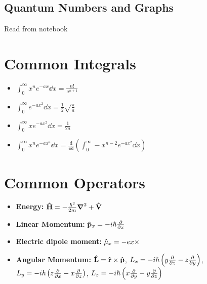 \documentclass[11pt]{article}
\theoremstyle{definition}
\begin{document}
\subsection{Quantum Numbers and Graphs}
Read from notebook

\section{Common Integrals}
\begin{itemize}
    \item $\int_0 ^{\infty} x^n e^{-a x} \dd{x}=\frac{n!}{a^{n+1}} $
    \item $\int_0^{\infty} e^{-ax^2} \dd{x} = \frac{1}{2} \sqrt{\frac{\pi}{a}} $
    \item $\int_0^{\infty} xe^{-ax^2} \dd{x} = \frac{1}{2a}$
    \item $\int_0^{\infty} x^n e^{-ax^2} \dd{x} = \frac{\text{d}}{\dd{a}} \left(\int_0^{\infty} -x^{n-2} e^{-ax^2} \dd{x}\right)$
\end{itemize}

\section{Common Operators}
\begin{itemize}
    \item \textbf{Energy: } $\vectorunit{H} = -\frac{\hbar^2}{2m} \grad^2 + \vectorunit{V}$
    \item \textbf{Linear Momentum: } $\vectorunit{p}_x = -i\hbar \frac{\partial}{\partial x}$
    \item \textbf{Electric dipole moment:} $\vectorunit{\mu}_x = -ex \times$
    \item \textbf{Angular Momentum: } $\vectorunit{L} = \vectorunit{r} \times \vectorunit{p}$, \quad
    $L_x = -i\hbar \left(y \pdv{z} - z \pdv{y}\right)$, \quad $L_y = -i\hbar \left(z \pdv{x} - x \pdv{z}\right)$, \quad $L_z = -i\hbar \left(x \pdv{y} - y \pdv{z}\right)$
    
\end{itemize}
\end{document}
